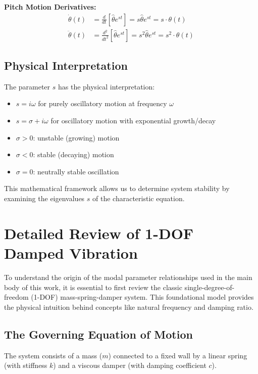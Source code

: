 \documentclass{article}
\begin{document}
\textbf{Pitch Motion Derivatives:}
\begin{align}
\dot{\theta}(t) &= \frac{d}{dt}[\hat{\theta} e^{st}] = s \hat{\theta} e^{st} = s \cdot \theta(t) \\
\ddot{\theta}(t) &= \frac{d^2}{dt^2}[\hat{\theta} e^{st}] = s^2 \hat{\theta} e^{st} = s^2 \cdot \theta(t)
\end{align}

\subsection{Physical Interpretation}

The parameter $s$ has the physical interpretation:
\begin{itemize}[noitemsep]
\item $s = i\omega$ for purely oscillatory motion at frequency $\omega$
\item $s = \sigma + i\omega$ for oscillatory motion with exponential growth/decay
\item $\sigma > 0$: unstable (growing) motion
\item $\sigma < 0$: stable (decaying) motion
\item $\sigma = 0$: neutrally stable oscillation
\end{itemize}

This mathematical framework allows us to determine system stability by examining the eigenvalues $s$ of the characteristic equation.
\newpage



\newpage
\newpage
\section{Detailed Review of 1-DOF Damped Vibration}

To understand the origin of the modal parameter relationships used in the main body of this work, it is essential to first review the classic single-degree-of-freedom (1-DOF) mass-spring-damper system. This foundational model provides the physical intuition behind concepts like natural frequency and damping ratio.

\subsection{The Governing Equation of Motion}
The system consists of a mass ($m$) connected to a fixed wall by a linear spring (with stiffness $k$) and a viscous damper (with damping coefficient $c$).
\end{document}
